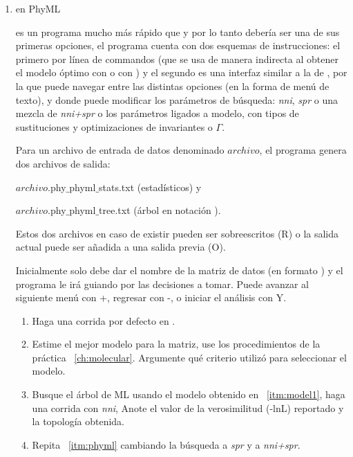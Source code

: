 \begin{enumerate}
\item{en PhyML}

   es un programa mucho m\'as r\'apido que  y  por lo tanto deber\'ia ser una de sus primeras opciones, el programa cuenta con dos esquemas de instrucciones: el primero por l\'inea de commandos (que se usa de manera indirecta al obtener el modelo \'optimo con  o con ) y el segundo es una interfaz similar a la de , por la que puede navegar entre las distintas opciones (en la forma de men\'u de texto), y donde puede modificar los par\'ametros de b\'usqueda: \textit{nni}, \textit{spr} o una mezcla de \textit{nni+spr} o los par\'ametros ligados a modelo, con tipos de sustituciones y optimizaciones de invariantes o $\Gamma$.

  Para un archivo de entrada de datos denominado $archivo$, el programa genera dos archivos de salida:

  $archivo$.phy$\_$phyml$\_$stats.txt (estad\'isticos) y

  $archivo$.phy$\_$phyml$\_$tree.txt (\'arbol en notaci\'on ).
  
  Estos dos archivos en caso de existir pueden ser sobreescritos (R) o la salida actual puede ser a\~nadida a una salida previa (O).

  Inicialmente solo debe dar el nombre de la matriz de datos (en formato ) y el programa le ir\'a guiando por las decisiones a tomar. Puede avanzar al siguiente men\'u con +, regresar con -, o iniciar el an\'alisis con Y.

	\begin{enumerate}
		\item Haga una corrida por defecto en .
		
		
		\item \label{itm:model1} Estime el mejor modelo para la matriz, use los procedimientos de la pr\'actica ~\ref{ch:molecular}. Argumente qu\'e criterio utiliz\'o para seleccionar el modelo.
		
		\item \label{itm:phyml} Busque el \'arbol de ML usando el modelo obtenido en ~\ref{itm:model1}, haga una corrida con \textit{nni},  Anote el valor de la verosimilitud (-lnL) reportado y la topolog\'ia obtenida.
		
		\item Repita ~\ref{itm:phyml} cambiando la b\'usqueda a \textit{spr} y a \textit{nni+spr}.
		

\end{enumerate}
\end{enumerate}
